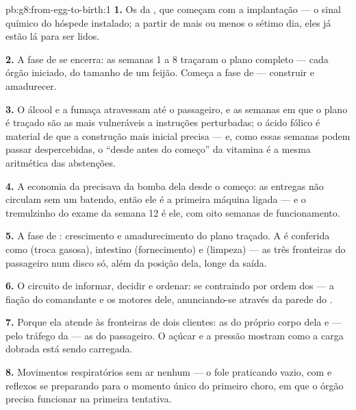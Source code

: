 \begin{solution}{pb:g8:from-egg-to-birth:1}
\textbf{1.} Os  da , que começam com a implantação ---
o sinal químico do hóspede instalado; a partir de mais ou menos o
sétimo dia, eles já estão lá para ser lidos.

\textbf{2.} A fase de  se encerra: as semanas 1 a 8 traçaram o
plano completo --- cada órgão iniciado, do tamanho de um feijão. Começa
a fase de  --- construir e amadurecer.

\textbf{3.} O álcool e a fumaça atravessam até o passageiro, e as
semanas em que o plano é traçado são as mais vulneráveis a instruções
perturbadas; o ácido fólico é material de que a construção mais
inicial precisa --- e, como essas semanas podem passar despercebidas, o
``desde antes do começo'' da vitamina é a mesma aritmética das
abstenções.

\textbf{4.} A economia da  precisava da bomba dela desde o
começo: as entregas não circulam sem um  batendo, então ele é a
primeira máquina ligada --- e o tremulzinho do exame da semana 12 é
ele, com oito semanas de funcionamento.

\textbf{5.} A fase de : crescimento e amadurecimento do plano
traçado. A  é conferida como  (troca gasosa), intestino
(fornecimento) e  (limpeza) --- as três fronteiras do passageiro num
disco só, além da posição dela, longe da saída.

\textbf{6.} O circuito de informar, decidir e ordenar:  se
contraindo por ordem dos  --- a fiação do comandante e os motores
dele, anunciando-se através da parede do .

\textbf{7.} Porque ela atende às fronteiras de dois clientes: as do
próprio corpo dela e --- pelo tráfego da  --- as do passageiro.
O açúcar e a pressão mostram como a carga dobrada está sendo
carregada.

\textbf{8.} Movimentos respiratórios sem ar nenhum --- o fole
praticando vazio, com  e reflexos se preparando para o momento
único do primeiro choro, em que o órgão precisa funcionar na primeira
tentativa.


\end{solution}
